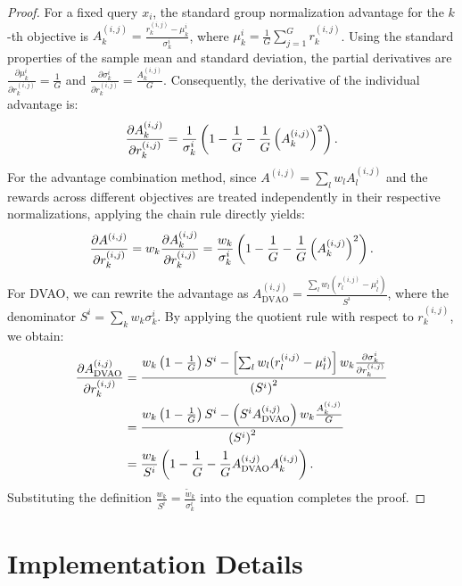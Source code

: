 \documentclass{llmxive}
\begin{document}
\begin{proof}
    For a fixed query $x_i$, the standard group normalization advantage for the $k$-th objective is $A_k^{(i,j)} = \frac{r_k^{(i,j)} - \mu_k^i}{\sigma_k^i}$, where $\mu_k^i = \frac{1}{G} \sum_{j=1}^G r_k^{(i,j)}$. Using the standard properties of the sample mean and standard deviation, the partial derivatives are $\frac{\partial \mu_k^i}{\partial r_k^{(i,j)}} = \frac{1}{G}$ and $\frac{\partial \sigma_k^i}{\partial r_k^{(i,j)}} = \frac{A_k^{(i,j)}}{G}$. Consequently, the derivative of the individual advantage is:
    \begin{align}
        \frac{\partial A_k^{(i,j)}}{\partial r_k^{(i,j)}} = \frac{1}{\sigma_k^i} \left( 1 - \frac{1}{G} - \frac{1}{G} \left(A_k^{(i,j)}\right)^2 \right).\notag
    \end{align}
    For the advantage combination method, since $A^{(i,j)} = \sum_l w_l A_l^{(i,j)}$ and the rewards across different objectives are treated independently in their respective normalizations, applying the chain rule directly yields:
    \begin{align}
        \frac{\partial A^{(i,j)}}{\partial r_k^{(i,j)}} = w_k \frac{\partial A_k^{(i,j)}}{\partial r_k^{(i,j)}} = \frac{w_k}{\sigma_k^i} \left( 1 - \frac{1}{G} - \frac{1}{G} \left(A_k^{(i,j)}\right)^2 \right).\notag
    \end{align}
    For DVAO, we can rewrite the advantage as $A_\text{DVAO}^{(i,j)} = \frac{\sum_l w_l (r_l^{(i,j)} - \mu_l^i)}{S^i}$, where the denominator $S^i = \sum_k w_k \sigma_k^i$. By applying the quotient rule with respect to $r_k^{(i,j)}$, we obtain:
    \begin{align}
        \frac{\partial A_\text{DVAO}^{(i,j)}}{\partial r_k^{(i,j)}} &= \frac{w_k \left( 1 - \frac{1}{G} \right) S^i - \left[ \sum_l w_l (r_l^{(i,j)} - \mu_l^i) \right] w_k \frac{\partial \sigma_k^i}{\partial r_k^{(i,j)}}}{\left(S^i\right)^2} \notag\\
        &= \frac{w_k \left( 1 - \frac{1}{G} \right) S^i - \left( S^i A_\text{DVAO}^{(i,j)} \right) w_k \frac{A_k^{(i,j)}}{G}}{\left(S^i\right)^2} \notag\\
        &= \frac{w_k}{S^i} \left( 1 - \frac{1}{G} - \frac{1}{G} A_\text{DVAO}^{(i,j)} A_k^{(i,j)} \right).\notag
    \end{align}
    Substituting the definition $\frac{w_k}{S^i} = \frac{\tilde{w}_k}{\sigma_k^i}$ into the equation completes the proof.
\end{proof}

\section{Implementation Details}
\label{appendix:implementation_details}
\end{document}
